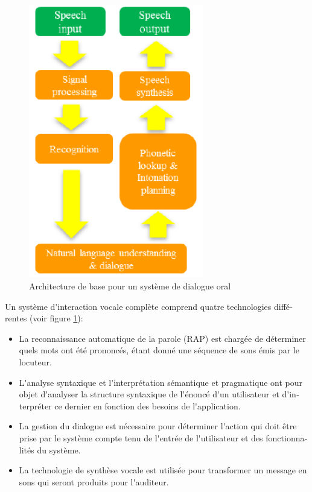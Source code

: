 \documentclass[]{../metanetpaper}
\begin{document}
\begin{french}
\begin{multicols}{2}
\begin{figure}[!ht]
\begin{center}
 \includegraphics[width=3.0in]{../_media/french/simple_speech-based_dialogue_architecture} 
\caption{Architecture de base pour un système de dialogue oral}
\label{fig:slds}
\end{center}
\end{figure}

Un système d{\mbox '}interaction vocale complète comprend quatre technologies
différentes (voir figure \ref{fig:slds}):
\begin{itemize}
\item La reconnaissance automatique de la parole (RAP) est chargée de
  déterminer quels mots ont été prononcés, étant donné une
  séquence de sons émis par le locuteur.
\item L{\mbox '}analyse syntaxique et l{\mbox '}interprétation sémantique et
  pragmatique ont pour objet d{\mbox '}analyser la structure syntaxique de
  l{\mbox '}énoncé d{\mbox '}un utilisateur et d{\mbox '}interpréter ce dernier en fonction
  des besoins de l{\mbox '}application.
\item La gestion du dialogue est nécessaire pour déterminer l{\mbox '}action
  qui doit être prise par le système compte tenu de l{\mbox '}entrée de
  l{\mbox '}utilisateur et des fonctionnalités du système.
\item La technologie de synthèse vocale est utilisée pour transformer
  un message en sons qui seront produits pour l{\mbox '}auditeur.
\end{itemize}


\end{multicols}
\end{french}
\end{document}
